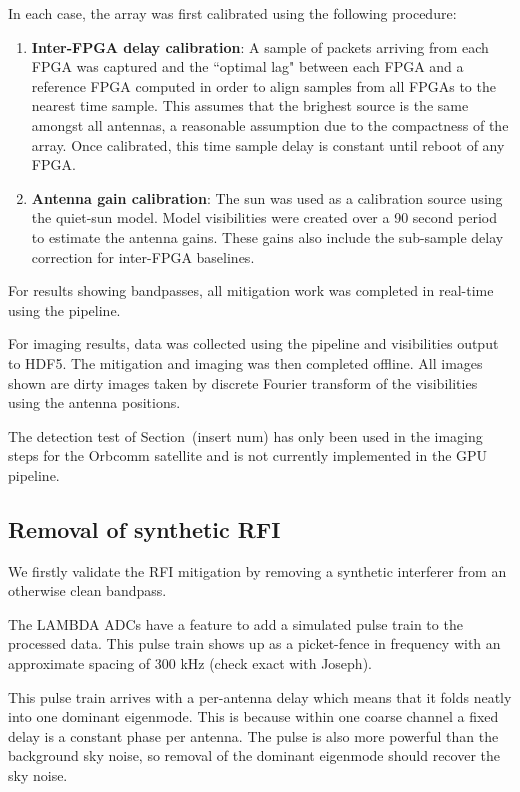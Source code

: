 \documentclass{pas}
\begin{document}
In each case, the array was first calibrated using the following procedure:
\begin{enumerate}
  \item \textbf{Inter-FPGA delay calibration}: A sample of packets arriving from each
    FPGA was captured and the ``optimal lag" between each FPGA and a reference FPGA 
    computed in order to align samples from all FPGAs to the nearest time sample.
    This assumes that the brighest source is the same amongst all antennas, a reasonable assumption due to 
    the compactness of the array. 
    Once calibrated, this time sample delay is constant until reboot of any FPGA.
  \item \textbf{Antenna gain calibration}: The sun was used as a calibration source
    using the quiet-sun model. Model visibilities were created over a 90 second period to
    estimate the antenna gains. These gains also include the sub-sample delay correction for 
    inter-FPGA baselines.
  \end{enumerate}

For results showing bandpasses, all mitigation work was completed in real-time using the pipeline.

For imaging results, data was collected using the pipeline and visibilities output to HDF5. 
The mitigation and imaging was then completed offline.
All images shown are dirty images taken by discrete Fourier transform of the visibilities using 
the antenna positions.

The detection test of Section~(insert num) has only been used in the imaging steps
for the Orbcomm satellite and is not currently implemented in the GPU pipeline.




\subsection{Removal of synthetic RFI}

We firstly validate the RFI mitigation by removing a synthetic interferer from 
an otherwise clean bandpass.

The LAMBDA ADCs have a feature to add a simulated pulse train to the processed data. 
This pulse train shows up as a picket-fence in frequency with an approximate
spacing of 300 kHz (check exact with Joseph).

This pulse train arrives with a per-antenna delay which means that it folds
neatly into one dominant eigenmode. This is because within one coarse channel a
fixed delay is a constant phase per antenna. The pulse is also more powerful
than the background sky noise, so removal of the dominant eigenmode should
recover the sky noise.
\end{document}
